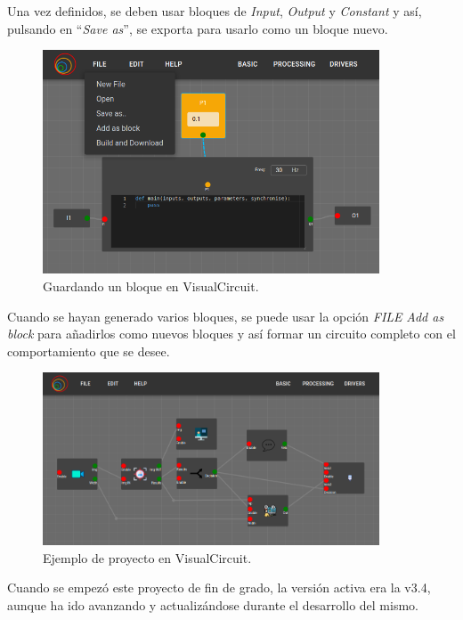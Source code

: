 Una vez definidos, se deben usar bloques de \textit{Input}, \textit{Output} y \textit{Constant} y así, pulsando en ``\textit{Save as}'',
se exporta para usarlo como un bloque nuevo.
\begin{figure} [H]
  \begin{center}
      \includegraphics[width=10cm]{figs/c4/VC_saveas.png}
  \end{center}
  \caption[Guardando un bloque en VisualCircuit]{Guardando un bloque en VisualCircuit.}
  \label{fig:VC_saveas_bloque}
\end{figure}

Cuando se hayan generado varios bloques, se puede usar la opción \textit{FILE} \overrightarrow{ } \textit{Add as block} para añadirlos como nuevos bloques
y así formar un circuito completo con el comportamiento que se desee.
\begin{figure} [H]
  \begin{center}
      \includegraphics[width=10cm]{figs/c4/VC_example.png}
  \end{center}
  \caption[Ejemplo de proyecto en VisualCircuit]{Ejemplo de proyecto en VisualCircuit.}
  \label{fig:VC_example}
\end{figure}

Cuando se empezó este proyecto de fin de grado, la versión activa era la v3.4, aunque ha ido avanzando y actualizándose durante el desarrollo del mismo.


